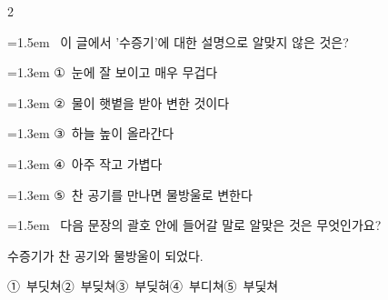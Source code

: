 \documentclass[12pt, a4paper]{article}
\begin{document}
\begin{multicols}{2}
\noindent\begin{minipage}{\columnwidth}
\vspace{2mm}
{\hangindent=1.5em  ~이 글에서 '수증기'에 대한 설명으로 알맞지 않은 것은?\par}

\vspace{0.5mm}
{\hangindent=1.3em  \noindent\hspace{0.3em}①~눈에 잘 보이고 매우 무겁다\par}
{\hangindent=1.3em  \noindent\hspace{0.3em}②~물이 햇볕을 받아 변한 것이다\par}
{\hangindent=1.3em  \noindent\hspace{0.3em}③~하늘 높이 올라간다\par}
{\hangindent=1.3em  \noindent\hspace{0.3em}④~아주 작고 가볍다\par}
{\hangindent=1.3em  \noindent\hspace{0.3em}⑤~찬 공기를 만나면 물방울로 변한다\par}
\vspace{4mm}
\end{minipage}
\par

\noindent\begin{minipage}{\columnwidth}
\vspace{2mm}
{\hangindent=1.5em  ~다음 문장의 괄호 안에 들어갈 말로 알맞은 것은 무엇인가요?\par}

\vspace{1mm}
\begin{boxibox}
수증기가 찬 공기와 \underline{\hspace{3cm}} 물방울이 되었다. \\
\end{boxibox}
\vspace{1mm}

\vspace{0.5mm}
\noindent
\mbox{①~부딧쳐}\hspace{1em}\mbox{②~부딪쳐}\hspace{1em}\mbox{③~부딪혀}\hspace{1em}\mbox{④~부디쳐}\hspace{1em}\mbox{⑤~부딫쳐}

\vspace{4mm}
\end{minipage}
\par


\end{multicols}
\end{document}
